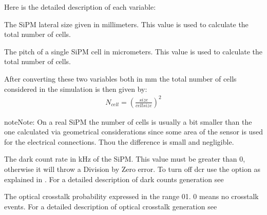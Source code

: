 \documentclass[letterpaper,10pt,english]{sphinxmanual}
\begin{document}
Here is the detailed description of each variable:


\begin{fulllineitems}
The SiPM lateral size given in millimeters. This value is used to calculate the total number of cells.

\end{fulllineitems}



\begin{fulllineitems}
The pitch of a single SiPM cell in micrometers. This value is used to calculate the total number of cells.

\end{fulllineitems}


After converting these two variables both in mm the total number of cells considered in the simulation is then given by:
\begin{equation*}
\begin{split}N_{cell} = \left(\frac{size}{cellsize}\right)^2\end{split}
\end{equation*}
\begin{sphinxadmonition}{note}{Note:}
On a real SiPM the number of cells is usually a bit smaller than the one calculated via geometrical considerations since some area of the sensor is used for the electrical connections. Thou the difference is small and negligible.
\end{sphinxadmonition}


\begin{fulllineitems}
The dark count rate in kHz of the SiPM. This value must be greater than 0, otherwise it will throw a Division by Zero error. To turn off dcr use the option  as explained in {\hyperref[\detokenize{setup:clineopts}]{}} . For a detailed description of dark counts generation see {\hyperref[\detokenize{theory:dcrtheory}]{}}

\end{fulllineitems}



\begin{fulllineitems}
The optical crosstalk probability expressed in the range 0\sphinxhyphen{}1. 0 means no crosstalk events. For a detailed description of optical crosstalk generation see {\hyperref[\detokenize{theory:xttheory}]{}}

\end{fulllineitems}
\end{document}
